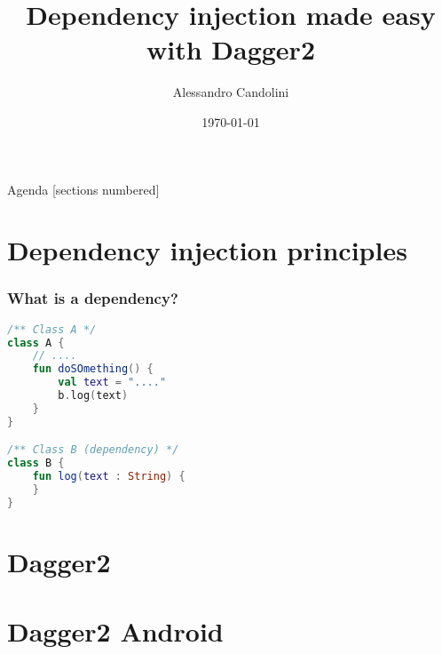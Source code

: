 \documentclass[10pt]{beamer}
\title{Dependency injection made easy with Dagger2}
\date{\today}
\author[A. Candolini]{Alessandro Candolini}
\begin{document}
\maketitle

\begin{frame}{Agenda}
  [sections numbered]
  \tableofcontents[hideallsubsections]
\end{frame}

\section{Dependency injection principles}
\begin{frame}[fragile]
	\frametitle{What is a dependency?}
		\begin{figure}
			\centering
{}
		\end{figure}
\end{frame}
\begin{frame}[fragile]
\begin{lstlisting}[language=Kotlin, basicstyle=\ttfamily]
/** Class A */
class A {
    // ....
    fun doSOmething() {
        val text = "...."
        b.log(text)
    }
}

/** Class B (dependency) */
class B {
    fun log(text : String) {
    }
}
\end{lstlisting} 
\end{frame}
	\begin{frame}[fragile]
	\end{frame}

	\section{Dagger2}
	\section{Dagger2 Android }

% 
% 
\end{document}

